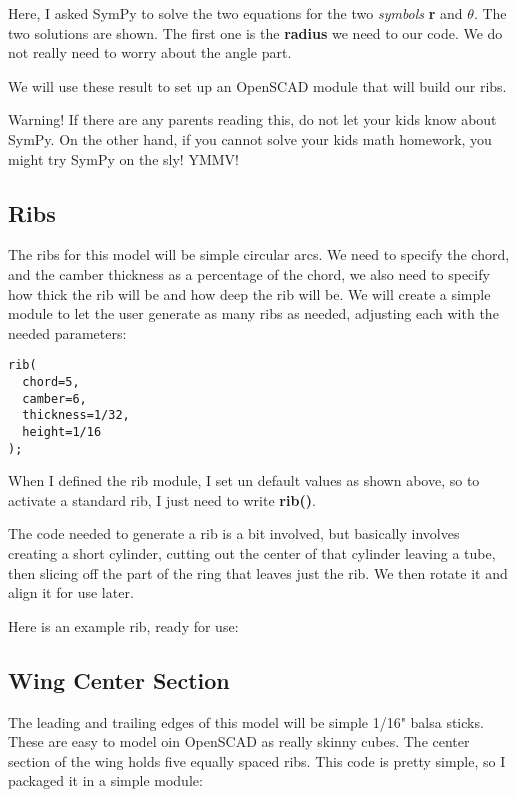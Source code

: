 Here, I asked SymPy to solve the two equations for the two {\it symbols} {\bf r}
and {$\theta$}. The two solutions are shown. The first one is the {\bf radius} we need to our code.  We do not really need to worry
about the angle part.

We will use these result to set up an OpenSCAD module that will build our ribs.

Warning! If there are any parents reading this, do not let your kids know about
SymPy.  On the other hand, if you cannot solve your kids math homework, you
might try SymPy on the sly! YMMV!

\subsection{Ribs}

The ribs for this model will be simple circular arcs. We need to specify the
chord, and the camber thickness as a percentage of the chord, we also need to
specify how thick the rib will be and how deep the rib will be. We will create
a simple module to let the user generate as many ribs as needed, adjusting each
with the needed parameters:

\begin{lstlisting}
rib(
  chord=5,
  camber=6,
  thickness=1/32,
  height=1/16
);
\end{lstlisting}

When I defined the rib module, I set un default values as shown above, so to
activate a standard rib, I just need to write {\bf rib()}.

The code needed to generate a rib is a bit involved, but basically involves
creating a short cylinder, cutting out the center of that cylinder leaving a
tube, then slicing off the part of the ring that leaves just the rib. We then
rotate it and align it for use later.

Here is an example rib, ready for use:


\subsection{Wing Center Section}

The leading and trailing edges of this model will be simple 1/16" balsa sticks.
These are easy to model oin OpenSCAD as really skinny cubes. The center section
of the wing holds five equally spaced ribs. This code is pretty simple, so I
packaged it in a simple module:

